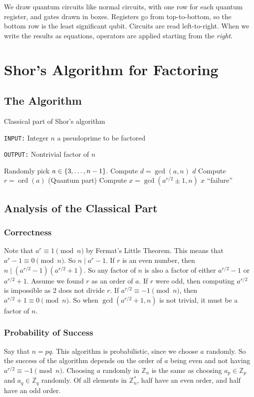 \documentclass[letterpaper]{article}
\DeclarePairedDelimiter{\set}{\{}{\}}
\DeclareMathOperator{\ord}{ord}
\newcommand{\ints}{\mathbb{Z}}
\begin{document}
	We draw quantum circuits like normal circuits, with one row for each quantum
	register, and gates drawn in boxes. Registers go from top-to-bottom, so the bottom row is the least significant qubit. Circuits are read left-to-right. When we write the results as equations, operators are  applied starting from the \emph{right}.
	\section{Shor's Algorithm for Factoring}
	\subsection{The Algorithm}
	\begin{algorithm}[H]
		\caption{Classical part of Shor's algorithm}
		\texttt{INPUT:} Integer $n$ a pseudoprime to be factored

		\texttt{OUTPUT:} Nontrivial factor of $n$
		\begin{algorithmic}[1]
			\STATE Randomly pick $a \in \set{3,\dots,n-1}$.
			\STATE Compute $d=\gcd(a,n)$
				\RETURN $d$
			\ENDIF
			\STATE Compute $r = \ord(a)$ (Quantum part)
				\STATE Compute $x=\gcd(a^{r/2}\pm1,n)$
					\RETURN $x$
				\ENDIF
			\ENDIF
			\RETURN ``failure''
		\end{algorithmic}
	\end{algorithm}
	\subsection{Analysis of the Classical Part}
		\subsubsection{Correctness}
		Note that $a^r\equiv 1 \pmod{n}$ by Fermat's Little Theorem. This means
		that $a^r-1\equiv 0\pmod{n}$. So $n\mid a^r-1$. If $r$ is an even
		number, then $n\mid (a^{r/2}-1)(a^{r/2}+1)$. So any factor of $n$ is
		also a factor of either $a^{r/2}-1$ or $a^{r/2}+1$.  Assume we found $r$
		as an order of $a$. If $r$ were odd, then computing $a^{r/2}$ is
		impossible as 2 does not divide $r$. If $a^{r/2}\equiv-1\pmod{n}$, then
		$a^{r/2}+1\equiv 0\pmod{n}$. So when $\gcd(a^{r/2}+1,n)$ is not trivial,
		it must be a factor of $n$.


		\subsubsection{Probability of Success}
		Say that $n=pq$. This algorithm is probabilistic, since we choose $a$
		randomly. So the success of the algorithm depends on the order of $a$
		being even and not having $a^{r/2}\equiv -1\pmod{n}$. Choosing $a$
		randomly in $\mathbb{Z}_n$ is the same as choosing $a_p\in\mathbb{Z}_p$
		and $a_q\in\ints_q$ randomly. Of all elements in $\ints_n^\ast$, half
		have an even order, and half have an odd order. 
		
\end{document}

